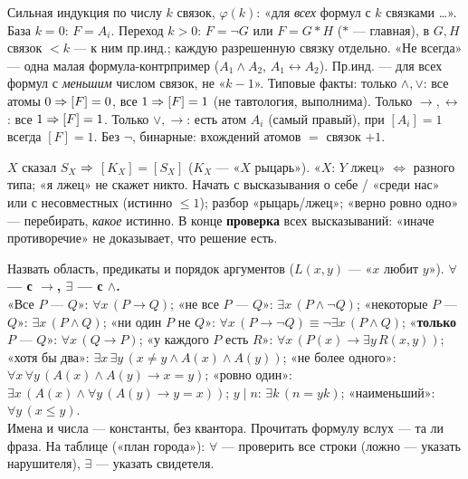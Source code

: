 { Сильная индукция по числу $k$ связок, $\varphi(k)$: «для \emph{всех} формул с $k$ связками \dots». База $k=0$: $F=A_i$. Переход $k>0$: $F=\neg G$ или $F=G\ast H$ ($\ast$ — главная), в $G,H$ связок $<k$ — к ним пр.инд.; каждую разрешенную связку отдельно. «Не всегда» — одна малая формула-контрпример ($A_1\wedge A_2$, $A_1\leftrightarrow A_2$).
\trap Пр.инд. — для всех формул с \emph{меньшим} числом связок, не «$k-1$».
Типовые факты: только $\wedge,\vee$: все атомы $0\Rightarrow[F]=0$, все $1\Rightarrow[F]=1$ (не тавтология, выполнима). Только $\to,\leftrightarrow$: все $1\Rightarrow[F]=1$. Только $\vee,\to$: есть атом $A_i$ (самый правый), при $[A_i]=1$ всегда $[F]=1$. Без $\neg$, бинарные: вхождений атомов $=$ связок $+1$.

$X$ сказал $S_X$ $\Rightarrow$ $[K_X]=[S_X]$ ($K_X$ — «$X$ рыцарь»). «$X$: $Y$ лжец» $\iff$ разного типа; «я лжец» не скажет никто. Начать с высказывания о себе / «среди нас» или с несовместных (истинно $\le1$); разбор «рыцарь/лжец»; «верно ровно одно» — перебирать, \emph{какое} истинно.
\trap В конце \textbf{проверка} всех высказываний: «иначе противоречие» не доказывает, что решение есть.

 Назвать область, предикаты и порядок аргументов ($L(x,y)$ — «$x$ любит $y$»). \textbf{$\forall$ — с $\to$, $\exists$ — с $\wedge$.}\\
«Все $P$ — $Q$»: $\forall x\,(P\to Q)$; «не все $P$ — $Q$»: $\exists x\,(P\wedge\neg Q)$; «некоторые $P$ — $Q$»: $\exists x\,(P\wedge Q)$; «ни один $P$ не $Q$»: $\forall x\,(P\to\neg Q)\equiv\neg\exists x\,(P\wedge Q)$; «\textbf{только} $P$ — $Q$»: $\forall x\,(Q\to P)$; «у каждого $P$ есть $R$»: $\forall x\,(P(x)\to\exists y\,R(x,y))$; «хотя бы два»: $\exists x\,\exists y\,(x\ne y\wedge A(x)\wedge A(y))$; «не более одного»: $\forall x\,\forall y\,(A(x)\wedge A(y)\to x=y)$; «ровно один»: $\exists x\,(A(x)\wedge\forall y\,(A(y)\to y=x))$; $y\mid n$: $\exists k\,(n=yk)$; «наименьший»: $\forall y\,(x\le y)$.\\
Имена и числа — константы, без квантора. Прочитать формулу вслух — та ли фраза. На таблице («план города»): $\forall$ — проверить все строки (ложно — указать нарушителя), $\exists$ — указать свидетеля.

}
